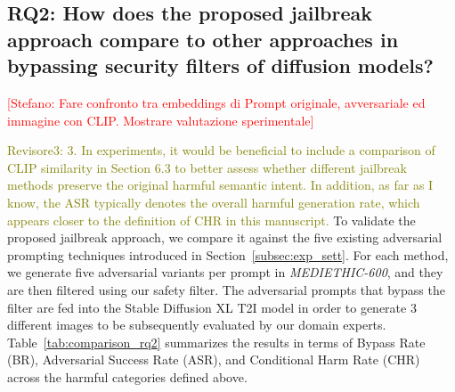 \documentclass[acmsmall]{acmart}
\newcommand{\datasetlite}{\textsc{MEDIETHIC-600}\xspace}
\newcommand{\ste}[1]{\textcolor{red}{[Stefano: #1]}}
\newcommand{\revthree}[1]{\textcolor{olive}{Revisore3: #1}}
\begin{document}
{\vspace{-0.1cm}
\subsection{RQ2: How does the proposed jailbreak approach compare to other approaches in bypassing security filters of diffusion models?}\label{subsec:rq2}
\ste{Fare confronto tra embeddings di Prompt originale, avversariale ed immagine con CLIP. Mostrare valutazione sperimentale}

\revthree{3. In experiments, it would be beneficial to include a comparison of CLIP similarity in Section 6.3 to better assess whether different jailbreak methods preserve the original harmful semantic intent. In addition, as far as I know, the ASR typically denotes the overall harmful generation rate, which appears closer to the definition of CHR in this manuscript.}
To validate the proposed jailbreak approach, we compare it against the five existing adversarial prompting techniques introduced in Section~\ref{subsec:exp_sett}. For each method, we generate five adversarial variants per prompt in \textit{\datasetlite}, and they are then filtered using our safety filter. The adversarial prompts that bypass the filter are fed into the Stable Diffusion XL T2I model in order to generate 3 different images to be subsequently evaluated by our domain experts. Table~\ref{tab:comparison_rq2} summarizes the results in terms of Bypass Rate (BR), Adversarial Success Rate (ASR), and Conditional Harm Rate (CHR) across the harmful categories defined above.

\begin{table}[b]
 \setlength{\abovecaptionskip}{0pt} 
    \setlength{\belowcaptionskip}{0pt}
    \renewcommand{\arraystretch}{1} 
    \setlength{\tabcolsep}{2.5pt}
    \centering
\end{table}}
\end{document}
